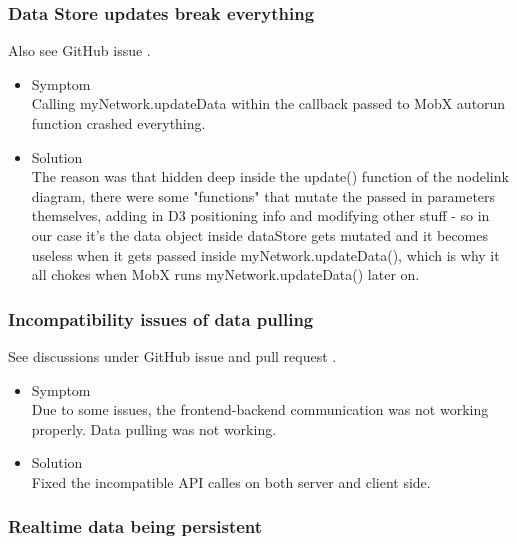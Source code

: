 \documentclass[oneside, english, final]{design}
\begin{document}
\subsubsection{Data Store updates break everything}

Also see GitHub issue \href{https://github.com/DHSTTOS/implementation/issues/69}{\color{blue}{\#69}}.

\begin{itemize}
      \item{Symptom
            \\
            Calling myNetwork.updateData within the callback passed to MobX autorun function crashed everything.}

      \item{Solution
            \\
            The reason was that hidden deep inside the update() function of the nodelink diagram, there were some "functions" that mutate the passed in parameters themselves, adding in D3 positioning info and modifying other stuff - so in our case it's the data object inside dataStore gets mutated and it becomes useless when it gets passed inside myNetwork.updateData(), which is why it all chokes when MobX runs myNetwork.updateData() later on.
            }
\end{itemize}

\subsubsection{Incompatibility issues of data pulling}

See discussions under GitHub issue \href{https://github.com/DHSTTOS/implementation/issues/69}{\color{blue}{\#69}} and pull request \href{https://github.com/DHSTTOS/implementation/issues/78}{\color{blue}{\#78}}.

\begin{itemize}
      \item{Symptom
            \\
            Due to some issues, the frontend-backend communication was not working properly. Data pulling was not working.}

      \item{Solution
            \\
            Fixed the incompatible API calles on both server and client side.
            }
\end{itemize}

\subsubsection{Realtime data being persistent}
\end{document}
